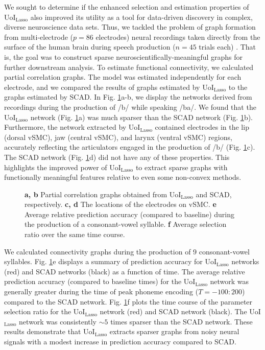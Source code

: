 \documentclass[letterpaper, 10 pt, conference]{ieeeconf}  %
\begin{document}
We sought to determine if the enhanced selection and estimation properties of UoI$_{\text{Lasso}}$ also improved its utility as a tool for data-driven discovery in complex, diverse neuroscience data sets. Thus, we tackled the problem of graph formation from multi-electrode ($p=86$ electrodes) neural recordings taken directly from the surface of the human brain during speech production ($n=45$ trials each) \cite{bouchard2013}. That is, the goal was to construct sparse neuroscientifically-meaningful graphs for further downstream analysis. To estimate functional connectivity, we calculated partial correlation graphs. The model was estimated independently for each electrode, and we compared the results of graphs estimated by UoI$_{\text{Lasso}}$ to the graphs estimated by SCAD. In Fig. \ref{fig:vsmc}a-b, we display the networks derived from recordings during the production of /b/ while speaking /ba/. We found that the UoI$_{\text{Lasso}}$ network (Fig. \ref{fig:vsmc}a) was much sparser than the SCAD network (Fig. \ref{fig:vsmc}b). Furthermore, the network extracted by UoI$_{\text{Lasso}}$ contained electrodes in the lip (dorsal vSMC), jaw (central vSMC), and larynx (ventral vSMC) regions, accurately reflecting the articulators engaged in the production of /b/ (Fig. \ref{fig:vsmc}c). The SCAD network (Fig. \ref{fig:vsmc}d) did not have any of these properties. This highlights the improved power of UoI$_{\text{Lasso}}$ to extract sparse graphs with functionally meaningful features relative to even some non-convex methods.
\begin{figure}[t!]
    \centering
    \caption{\textbf{a, b} Partial correlation graphs obtained from UoI$_{\text{Lasso}}$ and SCAD, respectively. \textbf{c, d} The locations of the electrodes on vSMC. \textbf{e} Average relative prediction accuracy (compared to baseline) during the production of a consonant-vowel syllable. \textbf{f} Average selection ratio over the same time course.}
    \label{fig:vsmc}
\end{figure}
We calculated connectivity graphs during the production of 9 consonant-vowel syllables. Fig. \ref{fig:vsmc}e displays a summary of prediction accuracy for UoI$_{\text{Lasso}}$ networks (red) and SCAD networks (black) as a function of time. The average relative prediction accuracy (compared to baseline times) for the UoI$_{\text{Lasso}}$ network was generally greater during the time of peak phoneme encoding ($T = -100:200$) compared to the SCAD network. Fig. \ref{fig:vsmc}f plots the time course of the parameter selection ratio for the UoI$_{\text{Lasso}}$ network (red) and SCAD network (black). The UoI$_{\text{Lasso}}$ network was consistently $\sim5$ times sparser than the SCAD network. These results demonstrate that UoI$_{\text{Lasso}}$ extracts sparser graphs from noisy neural signals with a modest increase in prediction accuracy compared to SCAD.
\end{document}

